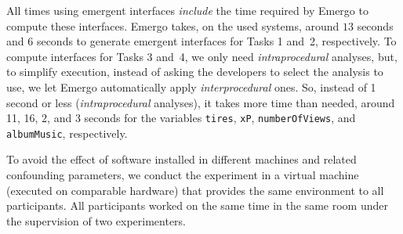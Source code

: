 All times using emergent interfaces \textit{include} the time required by Emergo to compute these interfaces. Emergo takes, on the used systems, around $13$ seconds and $6$ seconds to generate emergent interfaces for Tasks 1 and~2, respectively. To compute interfaces for Tasks 3 and~4, we only need \textit{intraprocedural} analyses,  but, to simplify execution, instead of asking the developers to select the analysis to use, we let Emergo automatically apply \textit{interprocedural} ones. So, instead of 1 second or less (\textit{intraprocedural} analyses), it takes more time than needed, around 11, 16, 2, and 3 seconds for the variables \texttt{tires}, \texttt{xP}, \texttt{numberOfViews}, and \texttt{albumMusic}, respectively.


To avoid the effect of software installed in different machines and related confounding parameters, we conduct the experiment in a virtual machine (executed on comparable hardware) that provides the same environment to all participants. All participants worked on the same time in the same room under the supervision of two experimenters.

%
%


